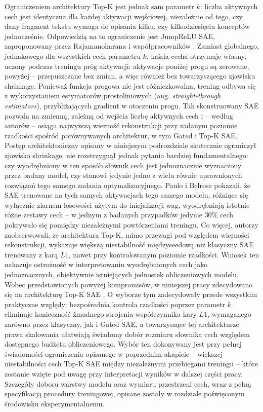 Ograniczeniem architektury Top-K jest jednak sam parametr $k$: liczba aktywnych cech jest identyczna dla każdej aktywacji wejściowej, niezależnie od tego, czy dany fragment tekstu wymaga do opisania kilku, czy kilkudziesięciu konceptów jednocześnie. Odpowiedzią na to ograniczenie jest JumpReLU SAE, zaproponowany przez Rajamanoharana i współpracowników \cite{rajamanoharan_2024b_jumprelu_sparse_autoencoders}. Zamiast globalnego, jednakowego dla wszystkich cech parametru $k$, każda cecha otrzymuje własny, uczony podczas treningu próg aktywacji: aktywacje poniżej progu są zerowane, powyżej -- przepuszczane bez zmian, a więc również bez towarzyszącego zjawisku shrinkage. Ponieważ funkcja progowa nie jest różniczkowalna, trening odbywa się z wykorzystaniem estymatorów prostoliniowych (ang. \textit{straight-through estimators}), przybliżających gradient w otoczeniu progu. Tak skonstruowany SAE pozwala na zmienną, zależną od wejścia liczbę aktywnych cech i -- według autorów -- osiąga najwyższą wierność rekonstrukcji przy zadanym poziomie rzadkości spośród porównywanych architektur, w tym Gated i Top-K SAE. \newline
Postęp architektoniczny opisany w niniejszym podrozdziale skutecznie ograniczył zjawisko shrinkage, nie rozstrzygnął jednak pytania bardziej fundamentalnego: czy wyodrębniony w ten sposób słownik cech jest jednoznacznie wyznaczony przez badany model, czy stanowi jedynie jedno z wielu równie uprawnionych rozwiązań tego samego zadania optymalizacyjnego. Paulo i Belrose \cite{paulo_2025_sae_trained_on_same_data_learn_different_features} pokazali, że SAE trenowane na tych samych aktywacjach tego samego modelu, różniące się wyłącznie ziarnem losowości użytym do inicjalizacji wag, wyodrębniają istotnie różne zestawy cech -- w jednym z badanych przypadków jedynie $30\%$ cech pokrywało się pomiędzy niezależnymi powtórzeniami treningu. Co więcej, autorzy zaobserwowali, że architektura Top-K, mimo przewagi pod względem wierności rekonstrukcji, wykazuje większą niestabilność międzyseedową niż klasyczny SAE trenowany z karą $L1$, nawet przy kontrolowanym poziomie rzadkości. Wniosek ten nakazuje ostrożność w interpretowaniu wyodrębnionych cech jako jednoznacznych, obiektywnie istniejących jednostek obliczeniowych modelu. \newline
Wobec przedstawionych powyżej kompromisów, w niniejszej pracy zdecydowano się na architekturę Top-K SAE \cite{gao_2024_scaling_evaluating_sparse_autoencoders}. O wyborze tym zadecydowały przede wszystkim praktyczne względy: bezpośrednia kontrola rzadkości poprzez parametr $k$ eliminuje konieczność żmudnego strojenia współczynnika kary $L1$, wymaganego zarówno przez klasyczny, jak i Gated SAE, a towarzyszące tej architekturze prawa skalowania ułatwiają świadomy dobór rozmiaru słownika cech względem dostępnego budżetu obliczeniowego. Wybór ten dokonywany jest przy pełnej świadomości ograniczenia opisanego w poprzednim akapicie -- większej niestabilności cech Top-K SAE między niezależnymi przebiegami treningu -- które zostanie wzięte pod uwagę przy interpretacji wyników w dalszej części pracy. Szczegóły doboru warstwy modelu oraz wymiaru przestrzeni cech, wraz z pełną specyfikacją procedury treningowej, opisane zostały w rozdziale poświęconym środowisku eksperymentalnemu.


